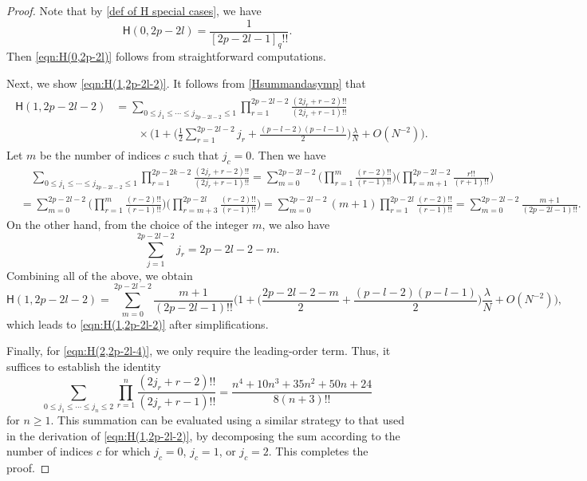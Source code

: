 \documentclass[10pt,a4paper]{amsart}
\begin{document}
\begin{proof}
    Note that by \eqref{def of H special cases}, we have
    \begin{equation*}
        \mathsf{H}(0,2p-2l)=\frac{1}{[2p-2l-1]_{q}!!}.
    \end{equation*}
    Then \eqref{eqn:H(0,2p-2l)} follows from straightforward computations. 
    
    Next, we show  \eqref{eqn:H(1,2p-2l-2)}. 
    It follows from \eqref{Hsummandasymp} that
    \begin{align}
    \begin{split}
    \label{eqn:asymptotic of H(1,2p-2l-2)}
        \mathsf{H}(1,2p-2l-2)&=\sum_{0\leq j_{1}{\leq}\cdots{\leq}j_{2p-2l-2}\leq1}
        \prod_{r=1}^{2p-2l-2}\frac{(2j_{r}+r-2)!!}{(2j_{r}+r-1)!!}
        \\
        &\qquad \times \bigg(1+\Big(\frac{1}{2}\sum_{r=1}^{2p-2l-2}j_r +\frac{(p-l-2)(p-l-1)}{2}\Big)\frac{\lambda}{N}+O(N^{-2})\bigg).
    \end{split}
    \end{align} 
    Let $m$ be the number of indices $c$ such that $j_c=0$. Then we have
    \begin{align*}
        &\quad \sum_{0\leq j_{1}{\leq} \cdots{\leq}j_{2p-2l-2}\leq1}\prod_{r=1}^{2p-2k-2}\frac{(2j_{r}+r-2)!!}{(2j_{r}+r-1)!!}
        =\sum_{m=0}^{2p-2l-2}
        \Big(\prod_{r=1}^{m}\frac{(r-2)!!}{(r-1)!!}\Big)
        \Big(\prod_{r=m+1}^{2p-2l-2}\frac{r!!}{(r+1)!!}\Big)
        \\
        &=\sum_{m=0}^{2p-2l-2}
        \Big(\prod_{r=1}^{m}\frac{(r-2)!!}{(r-1)!!}\Big)
        \Big(\prod_{r=m+3}^{2p-2l}\frac{(r-2)!!}{(r-1)!!}\Big)= \sum_{m=0}^{2p-2l-2} (m+1)\prod_{r=1}^{2p-2l}\frac{(r-2)!!}{(r-1)!!} =  \sum_{m=0}^{2p-2l-2}  \frac{m+1}{(2p-2l-1)!!}. 
    \end{align*} 
    On the other hand, from the choice of the integer $m$, we also have
    \begin{equation*}
        \sum_{j=1}^{2p-2l-2}j_{r}=2p-2l-2-m. 
    \end{equation*}
    Combining all of the above, we obtain 
    \begin{equation*}
        \mathsf{H}(1,2p-2l-2)
        =\sum_{m=0}^{2p-2l-2}\frac{m+1}{(2p-2l-1)!!}\bigg(1+\Big(\frac{2p-2l-2-m}{2}+\frac{(p-l-2)(p-l-1)}{2}\Big)\frac{\lambda}{N}+O(N^{-2})\bigg),
    \end{equation*}
    which leads to \eqref{eqn:H(1,2p-2l-2)} after simplifications. 
    
   Finally, for \eqref{eqn:H(2,2p-2l-4)}, we only require the leading-order term. Thus, it suffices to establish the identity
    \begin{equation}
        \sum_{0\leq j_1\leq\cdots\leq j_{n}\leq 2}\prod_{r=1}^{n}\frac{(2j_r +r-2)!!}{(2j_r +r-1)!!}=\frac{n^4+10n^3+35n^2+50n+24}{8(n+3)!!}
    \end{equation}
    for $n\geq1$. This summation can be evaluated using a similar strategy to that used in the derivation of \eqref{eqn:H(1,2p-2l-2)}, by decomposing the sum according to the number of indices \( c \) for which \( j_c = 0 \), \( j_c = 1 \), or \( j_c = 2 \). This completes the proof. 
\end{proof}
\end{document}
